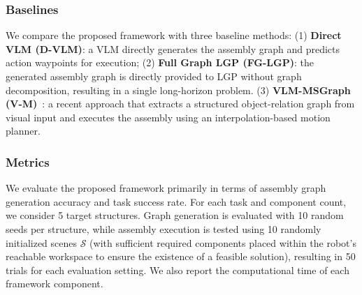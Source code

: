 \documentclass[letterpaper, 10 pt, conference]{ieeeconf}  %
\begin{document}

\subsubsection{Baselines} 
We compare the proposed framework with three baseline methods:
(1) \textbf{Direct VLM (D-VLM)}: a VLM directly generates the assembly graph and predicts action waypoints for execution;
(2) \textbf{Full Graph LGP (FG-LGP)}: the generated assembly graph is directly provided to LGP without graph decomposition, resulting in a single long-horizon problem.
(3) \textbf{VLM-MSGraph (V-M)}~\cite{li2025vlm}: a recent approach that extracts a structured object-relation graph from visual input and executes the assembly using an interpolation-based motion planner.


\subsubsection{Metrics}
We evaluate the proposed framework primarily in terms of assembly graph generation accuracy and task success rate. 
For each task and component count, we consider 5 target structures. 
Graph generation is evaluated with 10 random seeds per structure, while assembly execution is tested using 10 randomly initialized scenes $\mathcal{S}$ (with sufficient required components placed within the robot's reachable workspace to ensure the existence of a feasible solution), resulting in 50 trials for each evaluation setting. 
We also report the computational time of each framework component.
\end{document}
